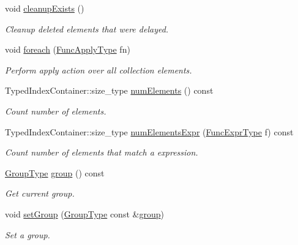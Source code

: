 \begin{DoxyCompactItemize}
void \hyperlink{structvt_1_1vrt_1_1collection_1_1_holder_aa6641e97e87778904b76dba93a69bb56}{cleanup\+Exists} ()
\begin{DoxyCompactList}\small\item\em Cleanup deleted elements that were delayed. \end{DoxyCompactList}\item 
void \hyperlink{structvt_1_1vrt_1_1collection_1_1_holder_a8d4a61cc04310a7c998fe37695bbbd6b}{foreach} (\hyperlink{structvt_1_1vrt_1_1collection_1_1_holder_a26e20d23447e935e218a07ffd638706d}{Func\+Apply\+Type} fn)
\begin{DoxyCompactList}\small\item\em Perform apply action over all collection elements. \end{DoxyCompactList}\item 
Typed\+Index\+Container\+::size\+\_\+type \hyperlink{structvt_1_1vrt_1_1collection_1_1_holder_aebff9d8a0b857688bf3b303cb832b543}{num\+Elements} () const
\begin{DoxyCompactList}\small\item\em Count number of elements. \end{DoxyCompactList}\item 
Typed\+Index\+Container\+::size\+\_\+type \hyperlink{structvt_1_1vrt_1_1collection_1_1_holder_aafc7aad37f14db35c91d3e085bdf0500}{num\+Elements\+Expr} (\hyperlink{structvt_1_1vrt_1_1collection_1_1_holder_a5c28963c09fd935028444c5a09fada2d}{Func\+Expr\+Type} f) const
\begin{DoxyCompactList}\small\item\em Count number of elements that match a expression. \end{DoxyCompactList}\item 
\hyperlink{namespacevt_a27b5e4411c9b6140c49100e050e2f743}{Group\+Type} \hyperlink{structvt_1_1vrt_1_1collection_1_1_holder_a579e33999a2d66ded9c3751be3ba11f8}{group} () const
\begin{DoxyCompactList}\small\item\em Get current group. \end{DoxyCompactList}\item 
void \hyperlink{structvt_1_1vrt_1_1collection_1_1_holder_ad1004d701690d7de8d323de1d5bc1a29}{set\+Group} (\hyperlink{namespacevt_a27b5e4411c9b6140c49100e050e2f743}{Group\+Type} const \&\hyperlink{structvt_1_1vrt_1_1collection_1_1_holder_a579e33999a2d66ded9c3751be3ba11f8}{group})
\begin{DoxyCompactList}\small\item\em Set a group. \end{DoxyCompactList}\item 

\end{DoxyCompactItemize}
